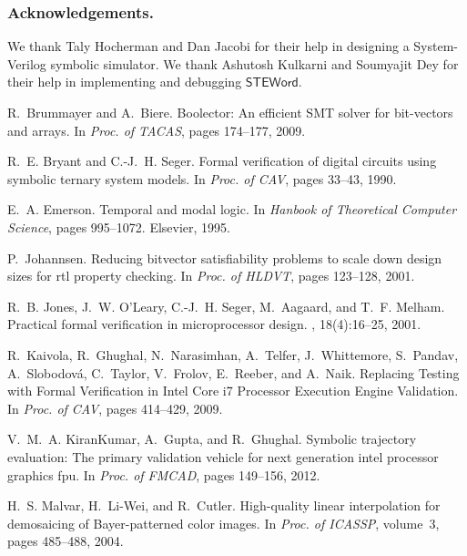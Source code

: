 \documentclass{llncs}
\newcommand{\steword}{\ensuremath{\mathsf{STEWord}}}
\begin{document}
\subsubsection{Acknowledgements.} We thank Taly Hocherman and Dan Jacobi for
their help in designing a System-Verilog symbolic simulator.  We thank
Ashutosh Kulkarni and Soumyajit Dey for their help in implementing and
debugging {\steword}.  
 
\begin{thebibliography}{10}

R.~Brummayer and A.~Biere.
\newblock Boolector: An efficient {SMT} solver for bit-vectors and arrays.
\newblock In {\em Proc. of TACAS}, pages 174--177, 2009.

R.~E. Bryant and C.-J.~H. Seger.
\newblock Formal verification of digital circuits using symbolic ternary system
  models.
\newblock In {\em Proc. of CAV}, pages 33--43, 1990.

E.~A. Emerson.
\newblock Temporal and modal logic.
\newblock In {\em Hanbook of {T}heoretical {C}omputer {S}cience}, pages
  995--1072. Elsevier, 1995.

P.~Johannsen.
\newblock Reducing bitvector satisfiability problems to scale down design sizes
  for rtl property checking.
\newblock In {\em Proc. of HLDVT}, pages 123--128, 2001.

R.~B. Jones, J.~W. O'Leary, C.-J.~H. Seger, M.~Aagaard, and T.~F. Melham.
\newblock Practical formal verification in microprocessor design.
, 18(4):16--25, 2001.

R.~Kaivola, R.~Ghughal, N.~Narasimhan, A.~Telfer, J.~Whittemore, S.~Pandav,
  A.~Slobodov{\'a}, C.~Taylor, V.~Frolov, E.~Reeber, and A.~Naik.
\newblock Replacing {T}esting with {F}ormal {V}erification in {I}ntel
  {C}ore i7 {P}rocessor {E}xecution {E}ngine {V}alidation.
\newblock In {\em Proc. of CAV}, pages 414--429, 2009.

V.~M.~A. KiranKumar, A.~Gupta, and R.~Ghughal.
\newblock Symbolic trajectory evaluation: The primary validation vehicle for
  next generation intel{\textregistered} processor graphics fpu.
\newblock In {\em Proc. of FMCAD}, pages 149--156, 2012.

H.~S. Malvar, H.~Li-Wei, and R.~Cutler.
\newblock High-quality linear interpolation for demosaicing of
  {B}ayer-patterned color images.
\newblock In {\em Proc. of ICASSP}, volume~3, pages 485--488, 2004.


\end{thebibliography}
\end{document}
